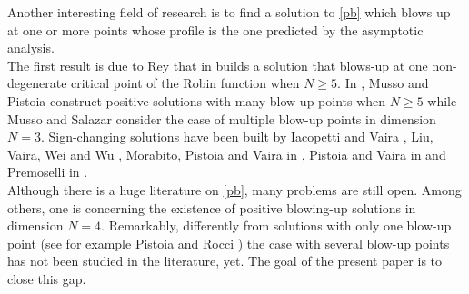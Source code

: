 \documentclass[11pt,a4paper]{amsart}
\theoremstyle{definition}
\renewcommand{\(}{\left(}
\renewcommand{\)}{\right)}
\begin{document}
Another interesting field of research is to find a   solution to \eqref{pb} which blows up at one or more points whose profile is the one predicted by the asymptotic analysis.\\ The first result is due to Rey that in \cite{R} builds a solution that blows-up at one non-degenerate critical point of the Robin function when $N\geq 5$. In \cite{MP}, Musso and Pistoia construct positive solutions with many blow-up points when $N\geq 5$ while Musso and Salazar \cite{MS} consider the case of multiple blow-up points in dimension $N=3$. Sign-changing solutions have been built by Iacopetti and Vaira  \cite{IV1, IV2}, Liu, Vaira, Wei and Wu \cite{LVWW}, Morabito, Pistoia and Vaira in \cite{MPV}, Pistoia and Vaira in \cite{PV,PV1} and Premoselli in \cite{P}.
\\

Although there is a huge literature on \eqref{pb}, many problems are still open. 
Among others, one is concerning the existence of positive blowing-up  solutions  in dimension $N=4$. 
Remarkably, differently from   solutions with only one blow-up point  (see for example Pistoia and Rocci \cite{PR}) the  case with several blow-up points has not been studied
 in the literature, yet. The goal of the present paper is to close
 this gap. \\
\end{document}
